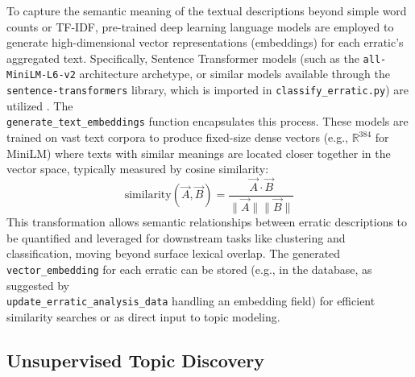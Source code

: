 \documentclass[
11pt, %
english, %
singlespacing, %
headsepline, %
]{MastersDoctoralThesis} %
\begin{document}
To capture the semantic meaning of the textual descriptions beyond simple word counts or TF-IDF, pre-trained deep learning language models are employed to generate high-dimensional vector representations (embeddings) for each erratic's aggregated text. Specifically, Sentence Transformer models (such as the \texttt{all-MiniLM-L6-v2} architecture archetype, or similar models available through the \texttt{sentence-transformers} library, which is imported in \texttt{classify\_erratic.py}) are utilized \cite{Reimers2019}. 
The \\ \texttt{generate\_text\_embeddings} function encapsulates this process. These models are trained on vast text corpora to produce fixed-size dense vectors (e.g., $\mathbb{R}^{384}$ for MiniLM) where texts with similar meanings are located closer together in the vector space, typically measured by cosine similarity:
$$ \text{similarity}(\vec{A}, \vec{B}) = \frac{\vec{A} \cdot \vec{B}}{\|\vec{A}\| \|\vec{B}\|} $$
This transformation allows semantic relationships between erratic descriptions to be quantified and leveraged for downstream tasks like clustering and classification, moving beyond surface lexical overlap. The generated \texttt{vector\_embedding} for each erratic can be stored (e.g., in the database, as suggested by \\\texttt{update\_erratic\_analysis\_data} handling an embedding field) for efficient similarity searches or as direct input to topic modeling.

\subsection{Unsupervised Topic Discovery}
\label{subsec:topic_discovery}
\end{document}
